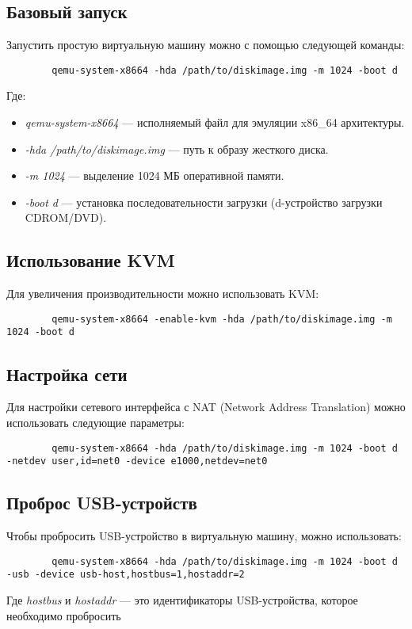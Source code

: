     \subsection{Базовый запуск}
    Запустить простую виртуальную машину можно с помощью следующей команды:
    \begin{lstlisting}
        qemu-system-x8664 -hda /path/to/diskimage.img -m 1024 -boot d
    \end{lstlisting}
    Где:
    \begin{itemize}
        \item \textit{qemu-system-x8664} — исполняемый файл для эмуляции x86\_64 архитектуры.
        \item \textit{-hda /path/to/diskimage.img} — путь к образу жесткого диска.
        \item \textit{-m 1024} — выделение 1024 МБ оперативной памяти.
        \item \textit{-boot d} — установка последовательности загрузки (d-устройство загрузки CDROM/DVD).
    \end{itemize}

    \subsection{Использование KVM}
    Для увеличения производительности можно использовать KVM:
    \begin{lstlisting}
        qemu-system-x8664 -enable-kvm -hda /path/to/diskimage.img -m 1024 -boot d
    \end{lstlisting}

    \subsection{Настройка сети}
    Для настройки сетевого интерфейса с NAT (Network Address Translation) можно использовать следующие параметры:
    \begin{lstlisting}
        qemu-system-x8664 -hda /path/to/diskimage.img -m 1024 -boot d -netdev user,id=net0 -device e1000,netdev=net0
    \end{lstlisting}

    \subsection{Проброс USB-устройств}
    Чтобы пробросить USB-устройство в виртуальную машину, можно использовать:
    \begin{lstlisting}
        qemu-system-x8664 -hda /path/to/diskimage.img -m 1024 -boot d -usb -device usb-host,hostbus=1,hostaddr=2
    \end{lstlisting}
    Где \textit{hostbus} и \textit{hostaddr} — это идентификаторы USB-устройства, которое необходимо пробросить

